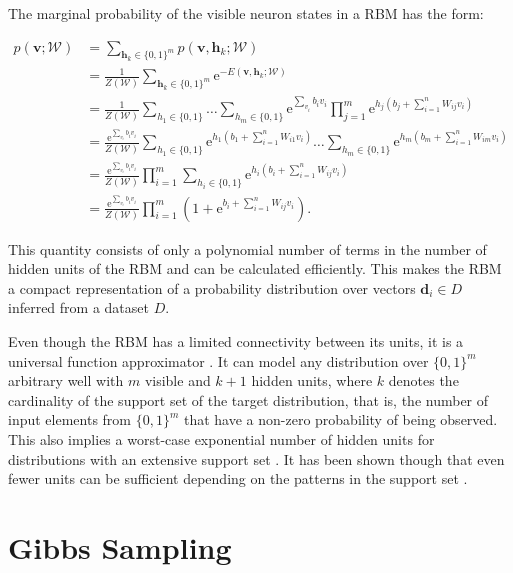 The marginal probability of the visible neuron states in a RBM has the form:

\begin{align}
   p(\bm{v};\mathcal{W}) &= \sum_{\bm{h}_k \in \{0,1\}^m} p(\bm{v},\bm{h}_k;\mathcal{W})\\
   &= \frac{1}{Z(\mathcal{W})}\sum_{\bm{h}_k \in \{0,1\}^m} \mathrm{e}^{-E(\bm{v}, \bm{h}_k;\mathcal{W})}\\
   &= \frac{1}{Z(\mathcal{W})}\sum_{h_1\in \{0,1\}}\dots\sum_{h_m \in \{0,1\}}\mathrm{e}^{\sum_{v_i}b_iv_i}\prod_{j=1}^m\mathrm{e}^{h_j(b_j + \sum_{i=1}^nW_{ij}v_i)}\\
   &= \frac{\mathrm{e}^{\sum_{v_i}b_iv_i}}{Z(\mathcal{W})}\sum_{h_1 \in \{0,1\}}\mathrm{e}^{h_1(b_1 + \sum_{i=1}^nW_{i1}v_i)}\dots\sum_{h_m \in \{0,1\}}\mathrm{e}^{h_m(b_m + \sum_{i=1}^nW_{im}v_i)}\\
   &= \frac{\mathrm{e}^{\sum_{v_i}b_iv_i}}{Z(\mathcal{W})}\prod_{i=1}^m\sum_{h_i \in \{0,1\}}\mathrm{e}^{h_i(b_i + \sum_{i=1}^nW_{ij}v_i)}\\
   \label{eq:rbm}
   &= \frac{\mathrm{e}^{\sum_{v_i}b_iv_i}}{Z(\mathcal{W})}\prod_{i=1}^m(1+\mathrm{e}^{b_i + \sum_{i=1}^nW_{ij}v_i}).
\end{align}

This quantity consists of only a polynomial number of terms in the number of hidden units of the RBM and can be calculated efficiently. This makes the RBM a compact representation of a probability distribution over vectors $\bm{d}_i \in D$ inferred from a dataset $D$.

Even though the RBM has a limited connectivity between its units, it is a universal function approximator \cite{le2008representational}.
It can model any distribution over $\{0,1\}^m$ arbitrary well with $m$ visible and $k+1$ hidden units, where 
$k$ denotes the cardinality of the support set of the target distribution, that is, the number of input elements
from $\{0,1\}^m$ that have a non-zero probability of being observed. This also implies a worst-case 
exponential number of hidden units for distributions with an extensive support set \cite{le2008representational}. It has been shown though that even fewer units can be sufficient depending on the patterns in the support set \cite{montufar2011refinements}.

\section{Gibbs Sampling}
\label{sec:gibbsSampling}

